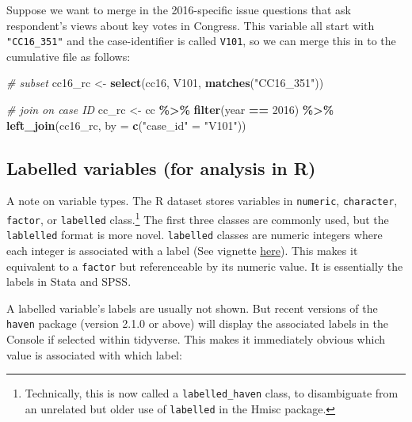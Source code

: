 \documentclass[10pt,article,oneside]{memoir}
\theoremstyle{definition}
\newenvironment{Shaded}{\begin{snugshade}}{\end{snugshade}}
\newcommand{\CommentTok}[1]{\textcolor[rgb]{0.56,0.35,0.01}{\textit{#1}}}
\newcommand{\DataTypeTok}[1]{\textcolor[rgb]{0.13,0.29,0.53}{#1}}
\newcommand{\DecValTok}[1]{\textcolor[rgb]{0.00,0.00,0.81}{#1}}
\newcommand{\KeywordTok}[1]{\textcolor[rgb]{0.13,0.29,0.53}{\textbf{#1}}}
\newcommand{\NormalTok}[1]{#1}
\newcommand{\OperatorTok}[1]{\textcolor[rgb]{0.81,0.36,0.00}{\textbf{#1}}}
\newcommand{\StringTok}[1]{\textcolor[rgb]{0.31,0.60,0.02}{#1}}
\begin{document}
Suppose we want to merge in the 2016-specific issue questions that ask
respondent's views about key votes in Congress. This variable all start
with \texttt{"CC16\_351"} and the case-identifier is called
\texttt{V101}, so we can merge this in to the cumulative file as
follows:

\begin{Shaded}
\begin{Highlighting}[]
\CommentTok{\# subset}
\NormalTok{cc16\_rc \textless{}{-}}\StringTok{ }\KeywordTok{select}\NormalTok{(cc16, V101, }\KeywordTok{matches}\NormalTok{(}\StringTok{"CC16\_351"}\NormalTok{))}

\CommentTok{\# join on case ID}
\NormalTok{cc\_rc \textless{}{-}}\StringTok{ }\NormalTok{cc }\OperatorTok{\%\textgreater{}\%}\StringTok{ }
\StringTok{  }\KeywordTok{filter}\NormalTok{(year }\OperatorTok{==}\StringTok{ }\DecValTok{2016}\NormalTok{) }\OperatorTok{\%\textgreater{}\%}\StringTok{ }
\StringTok{  }\KeywordTok{left\_join}\NormalTok{(cc16\_rc, }\DataTypeTok{by =} \KeywordTok{c}\NormalTok{(}\StringTok{"case\_id"}\NormalTok{ =}\StringTok{ "V101"}\NormalTok{))}
\end{Highlighting}
\end{Shaded}

\hypertarget{labelled-variables-for-analysis-in-r}{%
\subsection{Labelled variables (for analysis in
R)}\label{labelled-variables-for-analysis-in-r}}

A note on variable types. The R dataset stores variables in
\texttt{numeric}, \texttt{character}, \texttt{factor}, or
\texttt{labelled} class.\footnote{Technically, this is now called a
  \texttt{labelled\_haven} class, to disambiguate from an unrelated but
  older use of \texttt{labelled} in the Hmisc package.} The first three
classes are commonly used, but the \texttt{lablelled} format is more
novel. \texttt{labelled} classes are numeric integers where each integer
is associated with a label (See vignette
\href{https://cran.r-project.org/web/packages/labelled/vignettes/intro_labelled.html}{here}).
This makes it equivalent to a \texttt{factor} but referenceable by its
numeric value. It is essentially the labels in Stata and SPSS.

A labelled variable's labels are usually not shown. But recent versions
of the \texttt{haven} package (version 2.1.0 or above) will display the
associated labels in the Console if selected within tidyverse. This
makes it immediately obvious which value is associated with which label:
\end{document}
